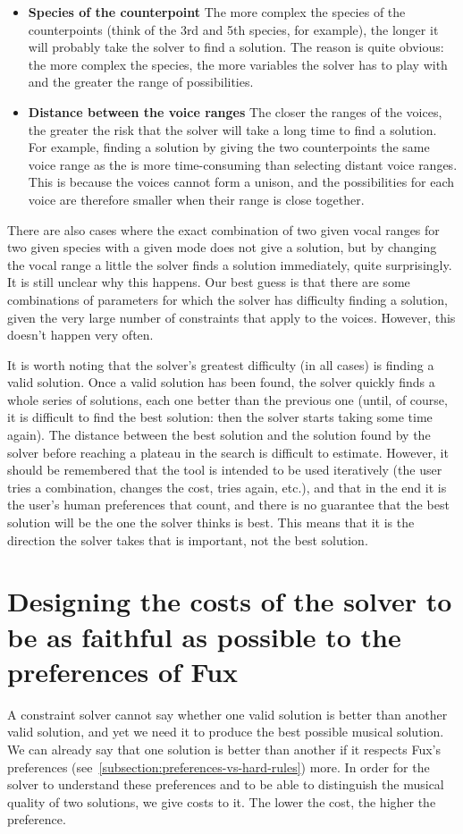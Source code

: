 \begin{itemize}
    \item \textbf{Species of the counterpoint} \textendash{} The more complex the species of the counterpoints (think of the 3rd and 5th species, for example), the longer it will probably take the solver to find a solution. The reason is quite obvious: the more complex the species, the more variables the solver has to play with and the greater the range of possibilities.  
    \item \textbf{Distance between the voice ranges} \textendash{}  The closer the ranges of the voices, the greater the risk that the solver will take a long time to find a solution. For example, finding a solution by giving the two counterpoints the same voice range as the \cfs is more time-consuming than selecting distant voice ranges. This is because the voices cannot form a unison, and the possibilities for each voice are therefore smaller when their range is close together. 
\end{itemize}
There are also cases where the exact combination of two given vocal ranges for two given species with a given mode does not give a solution, but by changing the vocal range a little the solver finds a solution immediately, quite surprisingly. It is still unclear why this happens. Our best guess is that there are some combinations of parameters for which the solver has difficulty finding a solution, given the very large number of constraints that apply to the voices. However, this doesn't happen very often.

It is worth noting that the solver's greatest difficulty (in all cases) is finding a valid solution. Once a valid solution has been found, the solver quickly finds a whole series of solutions, each one better than the previous one (until, of course, it is difficult to find the best solution: then the solver starts taking some time again). The distance between the best solution and the solution found by the solver before reaching a plateau in the search is difficult to estimate. However, it should be remembered that the tool is intended to be used iteratively (the user tries a combination, changes the cost, tries again, etc.), and that in the end it is the user's human preferences that count, and there is no guarantee that the best solution will be the one the solver thinks is best. This means that it is the direction the solver takes that is important, not the best solution.


\section{Designing the costs of the solver to be as faithful as possible to the preferences of Fux} \label{costs}
A constraint solver cannot say whether one valid solution is better than another valid solution, and yet we need it to produce the best possible musical solution. We can already say that one solution is better than another if it respects Fux's preferences (see~\ref{subsection:preferences-vs-hard-rules}) more. In order for the solver to understand these preferences and to be able to distinguish the musical quality of two solutions, we give costs to it.  The lower the cost, the higher the preference.

